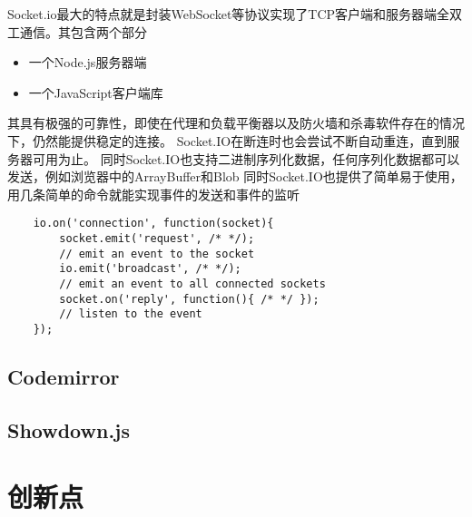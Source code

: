 \documentclass[11pt]{ctexart}
\begin{document}
Socket.io最大的特点就是封装WebSocket等协议实现了TCP客户端和服务器端全双工通信。其包含两个部分
\begin{itemize}
	\item 一个Node.js服务器端
	\item 一个JavaScript客户端库
\end{itemize}
其具有极强的可靠性，即使在代理和负载平衡器以及防火墙和杀毒软件存在的情况下，仍然能提供稳定的连接。
Socket.IO在断连时也会尝试不断自动重连，直到服务器可用为止。
同时Socket.IO也支持二进制序列化数据，任何序列化数据都可以发送，例如浏览器中的ArrayBuffer和Blob
同时Socket.IO也提供了简单易于使用，用几条简单的命令就能实现事件的发送和事件的监听
\begin{verbatim}
    io.on('connection', function(socket){
        socket.emit('request', /* */);
        // emit an event to the socket
        io.emit('broadcast', /* */);
        // emit an event to all connected sockets
        socket.on('reply', function(){ /* */ }); 
        // listen to the event
    });
\end{verbatim}
\subsection{Codemirror}
\subsection{Showdown.js}
\section{创新点}

\nocite{*}


\end{document}
